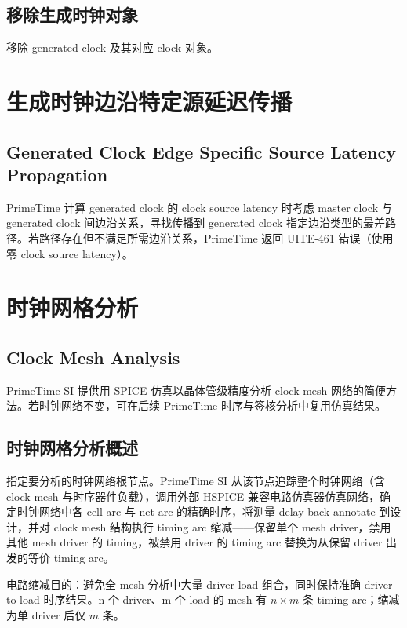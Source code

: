 \subsection{移除生成时钟对象}
 移除 generated clock 及其对应 clock 对象。

\section{生成时钟边沿特定源延迟传播}
\subsection*{Generated Clock Edge Specific Source Latency Propagation}

PrimeTime 计算 generated clock 的 clock source latency 时考虑 master clock 与 generated clock 间边沿关系，寻找传播到 generated clock 指定边沿类型的最差路径。若路径存在但不满足所需边沿关系，PrimeTime 返回 UITE-461 错误（使用零 clock source latency）。

\section{时钟网格分析}
\subsection*{Clock Mesh Analysis}

PrimeTime SI 提供用 SPICE 仿真以晶体管级精度分析 clock mesh 网络的简便方法。若时钟网络不变，可在后续 PrimeTime 时序与签核分析中复用仿真结果。

\subsection{时钟网格分析概述}
指定要分析的时钟网络根节点。PrimeTime SI 从该节点追踪整个时钟网络（含 clock mesh 与时序器件负载），调用外部 HSPICE 兼容电路仿真器仿真网络，确定时钟网络中各 cell arc 与 net arc 的精确时序，将测量 delay back-annotate 到设计，并对 clock mesh 结构执行 timing arc 缩减——保留单个 mesh driver，禁用其他 mesh driver 的 timing，被禁用 driver 的 timing arc 替换为从保留 driver 出发的等价 timing arc。


电路缩减目的：避免全 mesh 分析中大量 driver-load 组合，同时保持准确 driver-to-load 时序结果。n 个 driver、m 个 load 的 mesh 有 $n \times m$ 条 timing arc；缩减为单 driver 后仅 $m$ 条。

